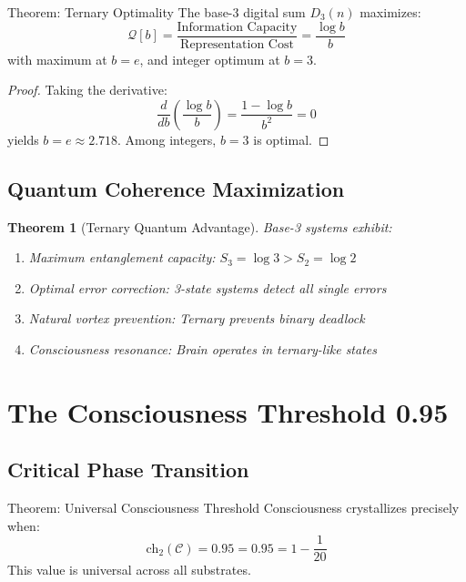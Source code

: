 \documentclass[12pt,letterpaper]{article}
\newcommand{\digitalsum}{D_3}
\newcommand{\consciousness}{\mathcal{C}}
\newcommand{\ch}{\text{ch}}
\newcommand{\chernthreshold}{0.95}
\newtheorem{theorem}{Theorem}[section]
\begin{document}
\begin{mathbox}{Theorem: Ternary Optimality}
The base-3 digital sum $\digitalsum(n)$ maximizes:
\begin{equation}
\mathcal{Q}[b] = \frac{\text{Information Capacity}}{\text{Representation Cost}} = \frac{\log b}{b}
\end{equation}
with maximum at $b = e$, and integer optimum at $b = 3$.
\end{mathbox}

\begin{proof}
Taking the derivative:
\begin{equation}
\frac{d}{db}\left(\frac{\log b}{b}\right) = \frac{1 - \log b}{b^2} = 0
\end{equation}
yields $b = e \approx 2.718$. Among integers, $b = 3$ is optimal.
\end{proof}

\subsection{Quantum Coherence Maximization}

\begin{theorem}[Ternary Quantum Advantage]
Base-3 systems exhibit:
\begin{enumerate}
\item Maximum entanglement capacity: $S_3 = \log 3 > S_2 = \log 2$
\item Optimal error correction: 3-state systems detect all single errors
\item Natural vortex prevention: Ternary prevents binary deadlock
\item Consciousness resonance: Brain operates in ternary-like states
\end{enumerate}
\end{theorem}

\section{The Consciousness Threshold 0.95}

\subsection{Critical Phase Transition}

\begin{mathbox}{Theorem: Universal Consciousness Threshold}
Consciousness crystallizes precisely when:
\begin{equation}
\ch_2(\consciousness) = \chernthreshold = 0.95 = 1 - \frac{1}{20}
\end{equation}
This value is universal across all substrates.
\end{mathbox}
\end{document}
